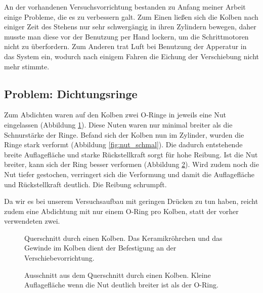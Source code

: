 \documentclass[
    11pt,
    ngerman
]{scrbook}
\begin{document}
An der vorhandenen Versuchsvorrichtung bestanden zu Anfang meiner Arbeit einige
Probleme, die es zu verbessern galt. Zum Einen ließen sich die Kolben nach
einiger Zeit des Stehens nur sehr schwergängig in ihren Zylindern bewegen,
daher musste man diese vor der Benutzung per Hand lockern, um die
Schrittmotoren nicht zu überfordern. Zum Anderen trat Luft bei Benutzung der
Apperatur in das System ein, wodurch nach einigem Fahren die Eichung der
Verschiebung nicht mehr stimmte.  

\subsection{Problem: Dichtungsringe}

Zum Abdichten waren auf den Kolben zwei O-Ringe in jeweils eine Nut
eingelassen (Abbildung \ref{fig:kolben}). Diese Nuten waren nur minimal
breiter als die Schnurstärke der Ringe. Befand sich der Kolben nun im Zylinder,
wurden die Ringe stark verformt (Abbildung \ref{fig:nut_schmal}). Die dadurch
entstehende breite Auflagefläche und starke Rückstellkraft sorgt für hohe
Reibung. Ist die Nut breiter, kann sich der Ring besser verformen (Abbildung
\ref{fig:nut_breit}). Wird zudem noch die Nut tiefer gestochen, verringert
sich die Verformung und damit die Auflagefläche und Rückstellkraft deutlich.
Die Reibung schrumpft.

Da wir es bei unserem Versuchsaufbau mit geringen Drücken zu tun haben, reicht
zudem eine Abdichtung mit nur einem O-Ring pro Kolben, statt der vorher
verwendeten zwei.

\begin{figure}[htbp]
    \centering
    
    \caption{%
        Querschnitt durch einen Kolben. Das Keramikröhrchen und das Gewinde im Kolben dient der Befestigung an der Verschiebevorrichtung.
    }
    \label{fig:kolben}
\end{figure}


\begin{figure}[htbp]
\begin{minipage}[htbp]{.45\textwidth}
    \centering
    
    \caption{%
        Ausschnitt aus dem Querschnitt durch einen Kolben. Breite Auflagefläche des O-Rings bei zu schmaler Nut.
    }
    \label{fig:nut_schmal}
\end{minipage}
\hfill
\begin{minipage}[htbp]{.45\textwidth}
    \centering
    
    \caption{%
        Ausschnitt aus dem Querschnitt durch einen Kolben. Kleine Auflagefläche wenn die Nut deutlich breiter ist als der O-Ring.
    }
    \label{fig:nut_breit}
\end{minipage}
\end{figure}
\end{document}
